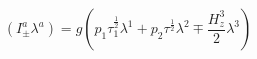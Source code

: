 \begin{equation}
\label{12}\left( I_{\pm }^a\lambda ^a\right) =g\left( p_1\tau _1^{\frac
12}\lambda ^1+p_2\tau ^{\frac 12}\lambda ^2\mp \frac{H_z^3}2\lambda
^3\right) 
\end{equation}

